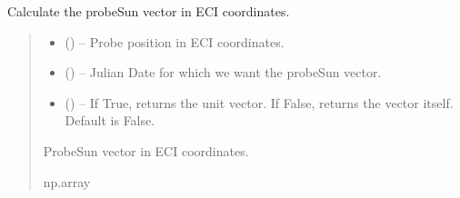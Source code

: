 \documentclass[letterpaper,10pt,english]{sphinxmanual}
\begin{document}

\begin{fulllineitems}
\label{\detokenize{fspsim.utils:fspsim.utils.Conversions.probe_sun_vec}}
\pysigstartsignatures
{}
\pysigstopsignatures
\sphinxAtStartPar
Calculate the probe\sphinxhyphen{}Sun vector in ECI coordinates.
\begin{quote}\begin{description}
\begin{itemize}
\item {} 
\sphinxAtStartPar
{} () – Probe position in ECI coordinates.

\item {} 
\sphinxAtStartPar
{} () – Julian Date for which we want the probe\sphinxhyphen{}Sun vector.

\item {} 
\sphinxAtStartPar
{} () – If True, returns the unit vector. If False, returns the vector itself. Default is False.

\end{itemize}

\sphinxAtStartPar
Probe\sphinxhyphen{}Sun vector in ECI coordinates.

\sphinxAtStartPar
np.array

\end{description}\end{quote}

\end{fulllineitems}

\end{document}
